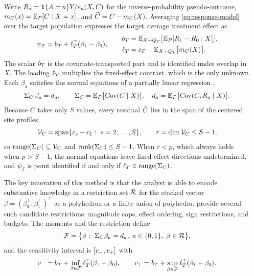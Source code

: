 Write $R_{a}=\mathbf{1}\{A=a\}Y/e_a(X,C)$ for the inverse-probability
pseudo-outcome, $m_C(x)=\mathbb{E}_P[C\mid X=x]$, and
$\widetilde C=C-m_C(X)$. Averaging \eqref{eq:response-model} over the target
population expresses the target average treatment effect as
\begin{equation}
  \psi_T=b_T+\ell_T^\top(\beta_1-\beta_0),
  \qquad
  \begin{aligned}
    b_T&=\mathbb{E}_{X\sim Q_T}\bigl[\mathbb{E}_P[R_{1}-R_{0}\mid X]\bigr],\\
    \ell_T&=c_T-\mathbb{E}_{X\sim Q_T}\bigl[m_C(X)\bigr].
  \end{aligned}
  \label{eq:target-coefficients}
\end{equation}
The scalar $b_T$ is the covariate-transported part and is identified
under overlap in $X$. The loading $\ell_T$ multiplies the fixed-effect
contrast, which is the only unknown. Each $\beta_a$ satisfies the normal
equations of a partially linear regression \citep{robinson1988root},
\begin{equation}
  \Sigma_C\,\beta_a=d_{a},
  \qquad
  \Sigma_C=\mathbb{E}_P\bigl[{\rm Cov}(C\mid X)\bigr],
  \quad
  d_{a}=\mathbb{E}_P\bigl[{\rm Cov}(C,R_{a}\mid X)\bigr].
  \label{eq:normal-equations}
\end{equation}
Because $C$ takes only $S$ values, every residual $\widetilde C$ lies in the
span of the centered site profiles,
\begin{equation}
  \Vspan=\operatorname{span}\{c_s-c_1:\ s=2,\ldots,S\},
  \qquad r=\dim\Vspan\leq S-1,
  \label{eq:span}
\end{equation}
so $\operatorname{range}(\Sigma_C)\subseteq\mathcal V_C$ and $\operatorname{rank}(\Sigma_C)\leq S-1$. When
$r<p$, which always holds when $p>S-1$, the normal equations leave
fixed-effect directions undetermined, and $\psi_T$ is point identified
if and only if $\ell_T\in\operatorname{range}(\Sigma_C)$.

The key innovation of this method is that the analyst is able to encode substantive knowledge in a restriction set
$\mathcal R$ for the stacked vector
$\beta=(\beta_0^\top,\beta_1^\top)^\top$ as a polyhedron or a finite union
of polyhedra. \citet{boyarsky2026} provide several such candidate restrictions: magnitude caps, effect ordering, sign restrictions, and
budgets. The moments and the restriction define
\begin{equation}
  \mathcal F
  =\bigl\{\beta:\ \Sigma_C\beta_a=d_{a},\ a\in\{0,1\},
  \ \beta\in\mathcal R\bigr\},
  \label{eq:feasible-set}
\end{equation}
and the sensitivity interval is $[v_{-},v_{+}]$ with
\begin{equation}
  v_{-}=b_T+\inf_{\beta\in\mathcal F}\ell_T^\top(\beta_1-\beta_0),
  \qquad
  v_{+}=b_T+\sup_{\beta\in\mathcal F}\ell_T^\top(\beta_1-\beta_0).
  \label{eq:endpoint-programs}
\end{equation}

